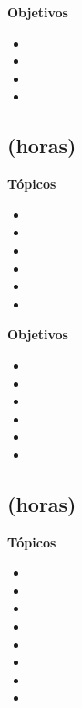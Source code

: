 \textbf{Objetivos}
\begin{itemize}
	\item \ARUNOObjUNO
	\item \ARUNOObjDOS
	\item \ARUNOObjTRES
	\item \ARUNOObjCUATRO
\end{itemize}

\subsection{\ARDOSDef  (\ARDOSHours horas)}\label{sec:BOK-AR2}

\textbf{Tópicos}
\begin{itemize}
	\item \ARDOSTopicBits
	\item \ARDOSTopicRepresentacion
	\item \ARDOSTopicSistemas
	\item \ARDOSTopicRepresentacionde
	\item \ARDOSTopicRepresentaciondedatos
	\item \ARDOSTopicRepresentacionderegistros
\end{itemize}

\textbf{Objetivos}
\begin{itemize}
	\item \ARDOSObjUNO
	\item \ARDOSObjDOS
	\item \ARDOSObjTRES
	\item \ARDOSObjCUATRO
	\item \ARDOSObjCINCO
	\item \ARDOSObjSEIS
\end{itemize}

\subsection{\ARTRESDef  (\ARTRESHours horas)}\label{sec:BOK-AR3}

\textbf{Tópicos}
\begin{itemize}
	\item \ARTRESTopicOrganizacion
	\item \ARTRESTopicUnidad
	\item \ARTRESTopicConjuntos
	\item \ARTRESTopicLenguaje
	\item \ARTRESTopicFormatos
	\item \ARTRESTopicModos
	\item \ARTRESTopicLlamada
	\item \ARTRESTopicEntradas
\end{itemize}

